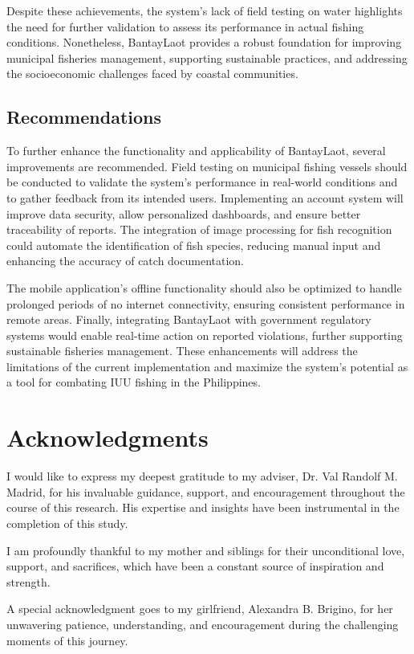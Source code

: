 \documentclass[journal]{IEEEtran}
\begin{document}
Despite these achievements, the system's lack of field testing on water highlights the need for further validation to assess its performance in actual fishing conditions. Nonetheless, BantayLaot provides a robust foundation for improving municipal fisheries management, supporting sustainable practices, and addressing the socioeconomic challenges faced by coastal communities.

\subsection{Recommendations}

To further enhance the functionality and applicability of BantayLaot, several improvements are recommended. Field testing on municipal fishing vessels should be conducted to validate the system’s performance in real-world conditions and to gather feedback from its intended users. Implementing an account system will improve data security, allow personalized dashboards, and ensure better traceability of reports. The integration of image processing for fish recognition could automate the identification of fish species, reducing manual input and enhancing the accuracy of catch documentation. 

The mobile application’s offline functionality should also be optimized to handle prolonged periods of no internet connectivity, ensuring consistent performance in remote areas. Finally, integrating BantayLaot with government regulatory systems would enable real-time action on reported violations, further supporting sustainable fisheries management. These enhancements will address the limitations of the current implementation and maximize the system’s potential as a tool for combating IUU fishing in the Philippines.

\section*{Acknowledgments}
I would like to express my deepest gratitude to my adviser, Dr. Val Randolf M. Madrid, for his invaluable guidance, support, and encouragement throughout the course of this research. His expertise and insights have been instrumental in the completion of this study.

I am profoundly thankful to my mother and siblings for their unconditional love, support, and sacrifices, which have been a constant source of inspiration and strength.

A special acknowledgment goes to my girlfriend, Alexandra B. Brigino, for her unwavering patience, understanding, and encouragement during the challenging moments of this journey.
\end{document}
